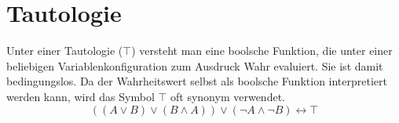 \begin{comment}
\section{Logische und binäre Verknüpfungen}
%
In Zusammenhang mit dem Lernen von Programmiersprachen entsteht die Frage, was der Unterschied zwischen logischen und binären Evaluierungen von boolschen Ausdrücken ist. Wir betrachten die Programmiersprache C.
%
\lstset{language={C}, caption={Unterschied zwischen logischen und binären Operatoren}, label={lst:difflogbin}}
\begin{lstlisting}
if (6 & 1) printf("foo");
if (6 && 1) printf("bar");
\end{lstlisting}
%
Dieses Teilprogramm gibt nur ,,bar`` zurück. Für die C-Programmiersprache sei auf den Artikel \href{http://cm.bell-labs.com/who/dmr/chist.html}{,,The Development of the C Language*``} von Dennis M. Ritchie\footnote{englischsprachiger Artikel. Unterkapitel ,,Neonatal C`` geht auf den Unterschied ein. Zuletzt abgerufen im November 2012} verwiesen. Die Frage nach dem Unterschied kann wie folgt beantwortet werden:

Bei einem Binäroperator wie etwa \& oder \textbar{} werden die beiden Operanden binär interpretiert. Dies bedeutet 6 (binär \binval{110}) und-verknüpft mit 1 (binär \binval{1}) ergibt \binval{000}.
\begin{center}
  \begin{tabular}{lccc}
       & 1 & 1 & 0 \\
       & 0 & 0 & 1 \\
  \hline
    \& & 0 & 0 & 0
  \end{tabular}
\end{center}

Bei einem logischen Operator (\&\&, \textbar\textbar) wird der Ausdruck zuerst in einen Binärwert verwandelt und später binär evaluiert. So evaluiert 6 (Wahrheitswert wahr, binär \binval{1}) und 1 (Wahrheitswert wahr, binär \binval{1}) zu wahr (binär \binval{1}). Ich möchte in Erinnerung rufen, dass in der Programmiersprache C Ausdrücke gleich Null (\texttt{NULL} und \texttt{0}) als falsch interpretiert werden. Alle anderen Ausdrücke sind wahr.
\end{comment}
%
\section{Tautologie}
%
Unter einer Tautologie ($\top$) versteht man eine boolsche Funktion, die unter einer beliebigen Variablenkonfiguration zum Ausdruck Wahr evaluiert. Sie ist damit bedingungslos. Da der Wahrheitswert selbst als boolsche Funktion interpretiert werden kann, wird das Symbol $\top$ oft synonym verwendet.
\begin{equation}
  ((A \lor B) \lor (B \land A)) \lor (\neg A \land \neg B) \leftrightarrow \top
\end{equation}
%
